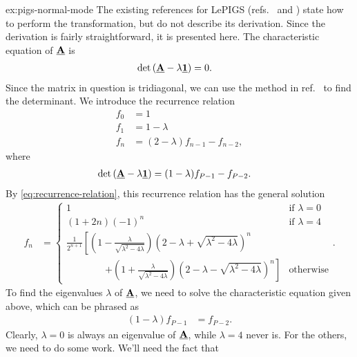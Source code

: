 \begin{DefAnswer}{ex:pigs-normal-mode}
	The existing references for LePIGS (refs.~\cite[63-66]{constable2012path} and \cite{constable2013langevin}) state how to perform the transformation, but do not describe its derivation.
	Since the derivation is fairly straightforward, it is presented here.
	The characteristic equation of $\underline{\bm{\mathbf{A}}}$ is
	\begin{align}
		\det{\left( \underline{\bm{\mathbf{A}}} - \lambda \underline{\bm{\mathbf{1}}} \right)}
		&= 0.
	\end{align}
	Since the matrix in question is tridiagonal, we can use the method in ref.~\cite{el2004inverse} to find the determinant.
	We introduce the recurrence relation
	\begin{subequations} \label{eq:pigs-recurrence}
	\begin{align}
		f_0
		&= 1 \\
		f_1
		&= 1 - \lambda \\
		f_n
		&= (2 - \lambda) f_{n-1} - f_{n-2},
	\end{align}
	\end{subequations}
	where
	\begin{align}
		\det{\left( \underline{\bm{\mathbf{A}}} - \lambda \underline{\bm{\mathbf{1}}} \right)}
		&= (1 - \lambda) f_{P-1} - f_{P-2}.
	\end{align}
	By \cref{eq:recurrence-relation}, this recurrence relation has the general solution
	\begin{align}
		f_n
		&= \begin{cases}
				1 & \text{if } \lambda = 0 \\
				(1 + 2 n) (-1)^n & \text{if } \lambda = 4 \\
				\frac{1}{2^{n+1}}
					\left[ \left( 1 - \frac{\lambda}{\sqrt{\lambda^2 - 4 \lambda}} \right)
								\left( 2 - \lambda + \sqrt{\lambda^2 - 4 \lambda} \right)^n
						\right.
					& \\
				\qquad\qquad
						\left.
							+ \left( 1 + \frac{\lambda}{\sqrt{\lambda^2 - 4 \lambda}} \right)
								\left( 2 - \lambda - \sqrt{\lambda^2 - 4 \lambda} \right)^n
						\right]
					& \text{otherwise}
			\end{cases}.
	\end{align}
	To find the eigenvalues $\lambda$ of $\underline{\bm{\mathbf{A}}}$, we need to solve the characteristic equation given above, which can be phrased as
	\begin{align}
		(1 - \lambda) f_{P-1}
		&= f_{P-2}.
	\end{align}
	Clearly, $\lambda = 0$ is always an eigenvalue of $\underline{\bm{\mathbf{A}}}$, while $\lambda = 4$ never is.
	For the others, we need to do some work.
	We'll need the fact that

\end{DefAnswer}
